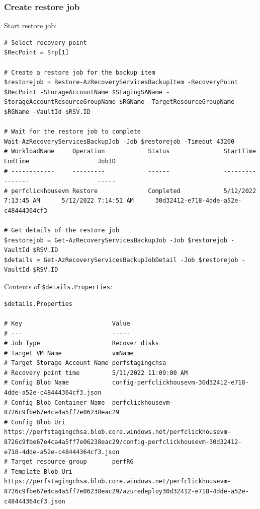 \subsubsection{Create restore job}
\label{sec:orgd99419b}
Start restore job:
\begin{verbatim}
# Select recovery point
$RecPoint = $rp[1]

# Create a restore job for the backup item
$restorejob = Restore-AzRecoveryServicesBackupItem -RecoveryPoint $RecPoint -StorageAccountName $StagingSAName -StorageAccountResourceGroupName $RGName -TargetResourceGroupName $RGName -VaultId $RSV.ID

# Wait for the restore job to complete
Wait-AzRecoveryServicesBackupJob -Job $restorejob -Timeout 43200
# WorkloadName     Operation            Status               StartTime                 EndTime                   JobID
# ------------     ---------            ------               ---------                 -------                   -----
# perfclickhousevm Restore              Completed            5/12/2022 7:13:45 AM      5/12/2022 7:14:51 AM      30d32412-e718-4dde-a52e-c48444364cf3

# Get details of the restore job
$restorejob = Get-AzRecoveryServicesBackupJob -Job $restorejob -VaultId $RSV.ID
$details = Get-AzRecoveryServicesBackupJobDetail -Job $restorejob -VaultId $RSV.ID
\end{verbatim}

Contents of \texttt{\$details.Properties}:
\begin{verbatim}
$details.Properties

# Key                         Value
# ---                         -----
# Job Type                    Recover disks
# Target VM Name              vmName
# Target Storage Account Name perfstagingchsa
# Recovery point time         5/11/2022 11:09:00 AM
# Config Blob Name            config-perfclickhousevm-30d32412-e718-4dde-a52e-c48444364cf3.json
# Config Blob Container Name  perfclickhousevm-8726c9fbe67e4ca4a5ff7e06238eac29
# Config Blob Uri             https://perfstagingchsa.blob.core.windows.net/perfclickhousevm-8726c9fbe67e4ca4a5ff7e06238eac29/config-perfclickhousevm-30d32412-e718-4dde-a52e-c48444364cf3.json
# Target resource group       perfRG
# Template Blob Uri           https://perfstagingchsa.blob.core.windows.net/perfclickhousevm-8726c9fbe67e4ca4a5ff7e06238eac29/azuredeploy30d32412-e718-4dde-a52e-c48444364cf3.json
\end{verbatim}

